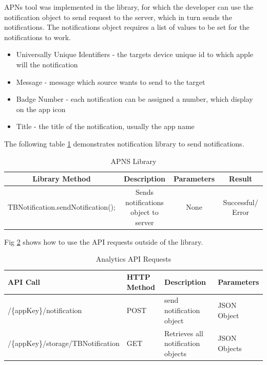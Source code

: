 APNs tool was implemented in the library, for which the developer can use the notification object to send request to the server, which in turn sends the notifications. The notifications object requires a list of values to be set for the notifications to work.

\begin{itemize}
  \item Universally Unique Identifiers
  - the targets device unique id to which apple will the notification
  \item Message
  - message which source wants to send to the target
  \item Badge Number
  - each notification can be assigned a number, which display on the app icon
  \item Title
  - the title of the notification, usually the app name
\end{itemize}

The following table \ref{table:mob_apns} demonstrates notification library to send notifications.

\begin{table}[!h]
\centering
\caption{APNS Library}
\label{table:mob_apns}
\begin{tabular}{|c|c|c|c|}
\hline
\rowcolor{green!20}
Library Method                    & Description                        & Parameters    & Result              \\ 
\hline
TBNotification.sendNotification();        & \makecell{Sends notifications\\ object to server} &  None & Successful/ Error   \\ 
\hline
\end{tabular}%
\end{table}

Fig \ref{table:apns} shows how to use the API requests outside of the library.

\begin{table}[!h]
\centering
\caption{Analytics API Requests}
\label{table:apns}
\begin{tabular}{|l|l|l|l|}
\hline
\rowcolor{green!20}
API Call                        & HTTP Method & Description                    & Parameters   \\ \hline
/\{appKey\}/notification & POST        & send notification object       & JSON Object  \\ \hline
/\{appKey\}/storage/TBNotification & GET         & Retrieves all notification objects & JSON Objects \\ \hline
\end{tabular}
\end{table}


